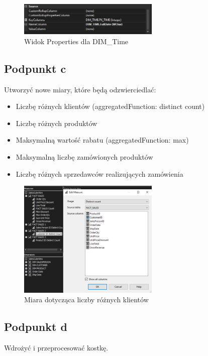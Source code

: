 \documentclass[a4paper,12pt]{article}
\begin{document}
\begin{figure}[H]
  \includegraphics[width=0.6\textwidth]{images/1b_time.png}
  \caption{Widok Properties dla DIM\_Time}
\end{figure}

\subsection{Podpunkt c}

Utworzyć nowe miary, które będą odzwierciedlać:

\begin{itemize}
  \item Liczbę różnych klientów (aggregatedFunction: distinct count)
  \item Liczbę różnych produktów
  \item Maksymalną wartość rabatu (aggregatedFunction: max)
  \item Maksymalną liczbę zamówionych produktów
  \item Liczbę różnych sprzedawców realizujących zamówienia
\end{itemize}

\begin{figure}[H]
  \includegraphics[width=0.6\textwidth]{images/1c.png}
  \caption{Miara dotycząca liczby różnych klientów}
\end{figure}

\subsection{Podpunkt d}

Wdrożyć i przeprocesować kostkę.
\end{document}
